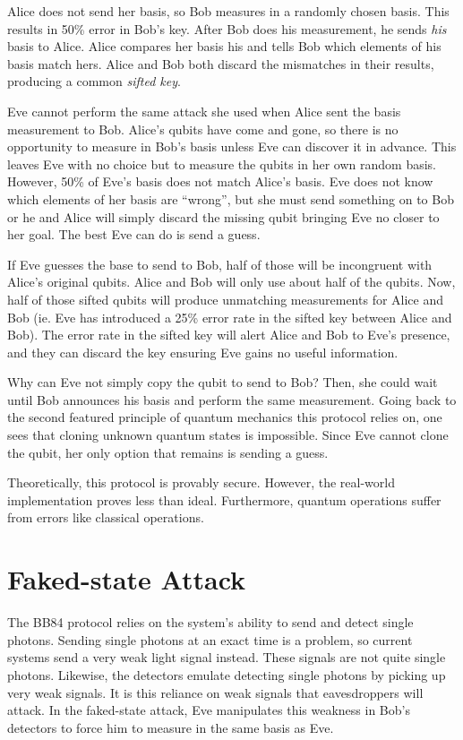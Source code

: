 \documentclass[12pt,twocolumn]{article}
\begin{document}
Alice does not send her basis, so Bob measures in a randomly chosen basis. This results in 50\% error in Bob's key. After Bob does his measurement, he sends \emph{his} basis to Alice. Alice compares her basis his and tells Bob which elements of his basis match hers. Alice and Bob both discard the mismatches in their results, producing a common \emph{sifted key}.

Eve cannot perform the same attack she used when Alice sent the basis measurement to Bob. Alice's qubits have come and gone, so there is no opportunity to measure in Bob's basis unless Eve can discover it in advance. This leaves Eve with no choice but to measure the qubits in her own random basis. However, 50\% of Eve's basis does not match Alice's basis. Eve does not know which elements of her basis are ``wrong”, but she must send something on to Bob or he and Alice will simply discard the missing qubit bringing Eve no closer to her goal. The best Eve can do is send a guess.

If Eve guesses the base to send to Bob, half of those will be incongruent with Alice's original qubits. Alice and Bob will only use about half of the qubits. Now, half of those sifted qubits will produce unmatching measurements for Alice and Bob (ie. Eve has introduced a 25\% error rate in the sifted key between Alice and Bob). The error rate in the sifted key will alert Alice and Bob to Eve's presence, and they can discard the key ensuring Eve gains no useful information.

Why can Eve not simply copy the qubit to send to Bob? Then, she could wait until Bob announces his basis and perform the same measurement. Going back to the second featured principle of quantum mechanics this protocol relies on, one sees that cloning unknown quantum states is impossible\cite{wootters:84}. Since Eve cannot clone the qubit, her only option that remains is sending a guess.

Theoretically, this protocol is provably secure.
However, the real-world implementation proves less than ideal.
Furthermore, quantum operations suffer from errors like classical operations.\cite{kak:96,kak:99}
\section{Faked-state Attack}
The BB84 protocol relies on the system's ability to send and detect single photons. Sending single photons at an exact time is a problem\cite{bell:64}, so current systems send a very weak light signal instead. These signals are not quite single photons. Likewise, the detectors emulate detecting single photons by picking up very weak signals. It is this reliance on weak signals that eavesdroppers will attack. In the faked-state attack, Eve manipulates this weakness in Bob's detectors to force him to measure in the same basis as Eve\cite{makarov:05}.
\end{document}
